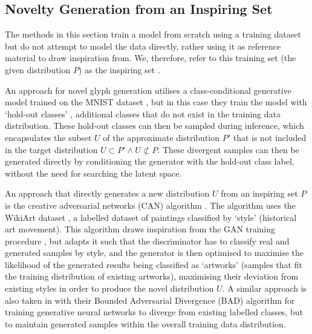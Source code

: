 \subsection{Novelty Generation from an Inspiring Set}
\label{survey:noveltygeneration}

The methods in this section train a model from scratch using a training dataset but do not attempt to model the data directly, rather using it as reference material to draw inspiration from. 
We, therefore, refer to this training set (the given distribution $P$) as the inspiring set \citep{ritchie2007some}.

An approach for novel glyph generation utilises a class-conditional generative model trained on the MNIST dataset \citep{lecun1998gradient}, but in this case they train the model with `hold-out classes' \citep{cherti2017out}, additional classes that do not exist in the training data distribution. 
These hold-out classes can then be sampled during inference, which encapsulates the subset $U$ of the approximate distribution $P'$ that is not included in the target distribution $U \subset P' \wedge U \not\subset P$. 
These divergent samples can then be generated directly by conditioning the generator with the hold-out class label, without the need for searching the latent space. 

An approach that directly generates a new distribution $U$ from an inspiring set $P$ is the creative adversarial networks (CAN) algorithm \citep{elgammal2017can}. 
The algorithm uses the WikiArt dataset \citep{saleh2016large}, a labelled dataset of paintings classified by `style' (historical art movement). This algorithm draws inspiration from the GAN training procedure \citep{goodfellow2014generative}, but adapts it such that the discriminator has to classify real and generated samples by style, and the generator is then optimised to maximise the likelihood of the generated results being classified as `artworks' (samples that fit the training distribution of existing artworks), maximising their deviation from existing styles in order to produce the novel distribution $U$. A similar approach is also taken in \cite{chelma2022creative} with their Bounded Adversarial Divergence (BAD) algorithm for training generative neural networks to diverge from existing labelled classes, but to maintain generated samples within the overall training data distribution.

